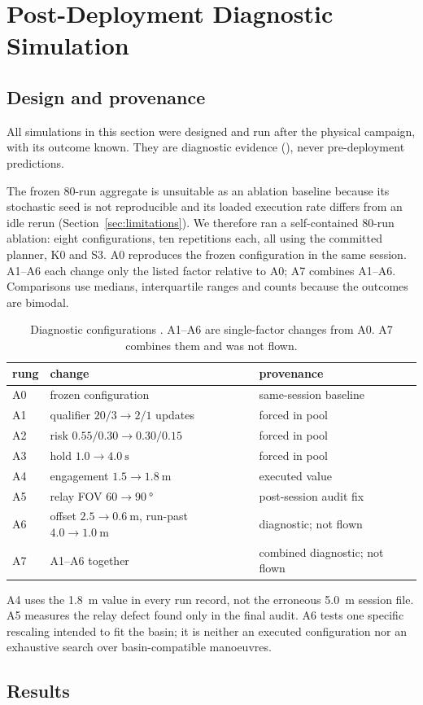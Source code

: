 \section{Post-Deployment Diagnostic Simulation \diagmark}
\label{sec:diagnostic}

\subsection{Design and provenance}

All simulations in this section were designed and run after the physical
campaign, with its outcome known. They are diagnostic evidence
(\diagmark), never pre-deployment predictions.

The frozen 80-run aggregate is unsuitable as an ablation baseline because
its stochastic seed is not reproducible and its loaded execution rate
differs from an idle rerun (Section~\ref{sec:limitations}). We therefore
ran a self-contained 80-run ablation: eight configurations, ten
repetitions each, all using the committed planner, \textsf{K0} and S3.
A0 reproduces the frozen configuration in the same session. A1--A6 each
change only the listed factor relative to A0; A7 combines A1--A6.
Comparisons use medians, interquartile ranges and counts because the
outcomes are bimodal.

\begin{table}[t]
\centering
\caption{Diagnostic configurations \diagmark. A1--A6 are single-factor
changes from A0. A7 combines them and was not flown.}
\label{tab:ablation-design}
\begin{tabular}{lll}
\toprule
rung & change & provenance \\
\midrule
A0 & frozen configuration & same-session baseline \\
A1 & qualifier $20/3 \to 2/1$ updates & forced in pool \\
A2 & risk $0.55/0.30 \to 0.30/0.15$ & forced in pool \\
A3 & hold $1.0 \to \SI{4.0}{\second}$ & forced in pool \\
A4 & engagement $1.5 \to \SI{1.8}{\metre}$ & executed value \\
A5 & relay FOV $60 \to \SI{90}{\degree}$ & post-session audit fix \\
A6 & offset $2.5 \to \SI{0.6}{\metre}$, run-past
     $4.0 \to \SI{1.0}{\metre}$ & diagnostic; not flown \\
A7 & A1--A6 together & combined diagnostic; not flown \\
\bottomrule
\end{tabular}
\end{table}

A4 uses the \SI{1.8}{\metre} value in every run record, not the erroneous
\SI{5.0}{\metre} session file. A5 measures the relay defect found only in
the final audit. A6 tests one specific rescaling intended to fit the
basin; it is neither an executed configuration nor an exhaustive search
over basin-compatible manoeuvres.

\subsection{Results}


